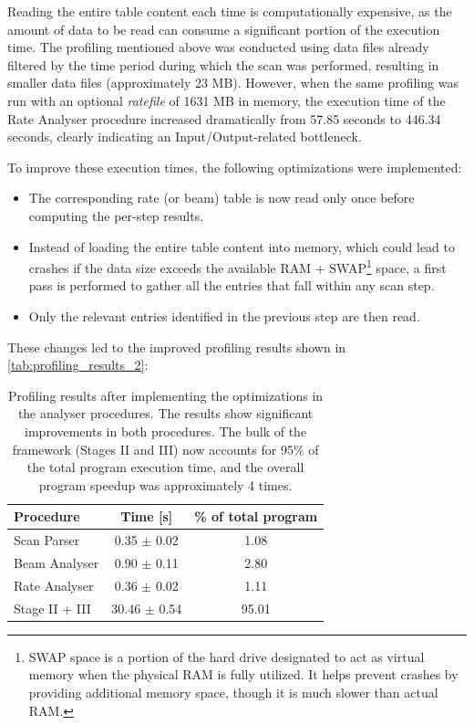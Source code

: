 Reading the entire table content each time is computationally expensive, as the amount of data to be read can consume a significant portion of the execution time. The profiling mentioned above was conducted using data files already filtered by the time period during which the scan was performed, resulting in smaller data files (approximately 23 MB). However, when the same profiling was run with an optional \textit{ratefile} of 1631 MB in memory, the execution time of the Rate Analyser procedure increased dramatically from 57.85 seconds to 446.34 seconds, clearly indicating an Input/Output-related bottleneck.

To improve these execution times, the following optimizations were implemented:

\begin{itemize}
	\item The corresponding rate (or beam) table is now read only once before computing the per-step results.
	\item Instead of loading the entire table content into memory, which could lead to crashes if the data size exceeds the available RAM + SWAP\footnote{SWAP space is a portion of the hard drive designated to act as virtual memory when the physical RAM is fully utilized. It helps prevent crashes by providing additional memory space, though it is much slower than actual RAM.} space, a first pass is performed to gather all the entries that fall within any scan step.
	\item Only the relevant entries identified in the previous step are then read.
\end{itemize}

These changes led to the improved profiling results shown in \autoref{tab:profiling_results_2}:

\begin{table}[!htb]
	\centering
	\caption[vdMfw profiling results after performance improvements]{Profiling results after implementing the optimizations in the analyser procedures. The results show significant improvements in both procedures. The bulk of the framework (Stages II and III) now accounts for 95\% of the total program execution time, and the overall program speedup was approximately 4 times.}
	\begin{tabular}{|l|c|c|}
		\hline
		\textbf{Procedure} & \textbf{Time [s]} & \textbf{\% of total program} \\
		\hline
		Scan Parser        & 0.35 $\pm$ 0.02   & 1.08                         \\
		Beam Analyser      & 0.90 $\pm$ 0.11   & 2.80                         \\
		Rate Analyser      & 0.36 $\pm$ 0.02   & 1.11                         \\
		Stage II + III     & 30.46 $\pm$ 0.54  & 95.01                        \\
		\hline
	\end{tabular}
	\label{tab:profiling_results_2}
\end{table}

